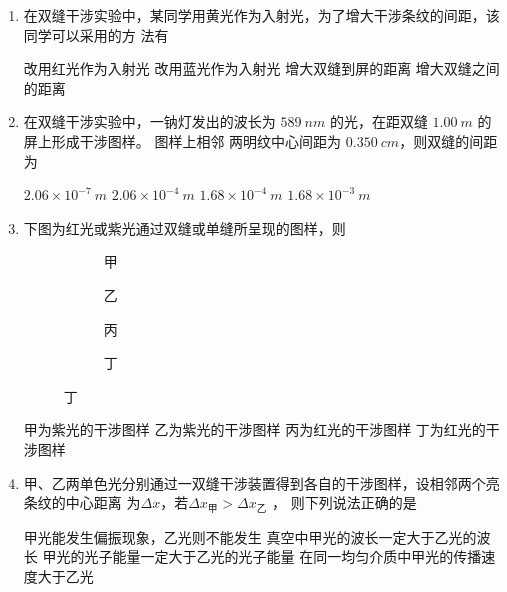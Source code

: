\begin{enumerate}
\item
{}
在双缝干涉实验中，某同学用黄光作为入射光，为了增大干涉条纹的间距，该同学可以采用的方
法有  

\fourchoices
{改用红光作为入射光}
{改用蓝光作为入射光}
{增大双缝到屏的距离}
{增大双缝之间的距离}


\item 
{}
在双缝干涉实验中，一钠灯发出的波长为 $ 589 \ nm $ 的光，在距双缝 $ 1.00 \ m $ 的屏上形成干涉图样。
图样上相邻 两明纹中心间距为 $ 0.350 \ cm $，则双缝的间距为  

\fourchoices
{$ 2.06 \times 10^{-7} \ m $}
{$ 2.06 \times 10^{-4} \ m $}
{$ 1.68 \times 10^{-4} \ m $}
{$ 1.68 \times 10^{-3} \ m $}


\item 
{}
下图为红光或紫光通过双缝或单缝所呈现的图样，则  
\begin{figure}[h!]
	\centering
\begin{subfigure}{0.22\linewidth}
	\centering
	 
	\caption*{甲}\label{}
\end{subfigure}
\begin{subfigure}{0.22\linewidth}
	\centering
	 
	\caption*{乙}\label{}
\end{subfigure}
\begin{subfigure}{0.22\linewidth}
	\centering
	 
	\caption*{丙}\label{}
\end{subfigure}
\begin{subfigure}{0.22\linewidth}
	\centering
	 
	\caption*{丁}\label{}
\end{subfigure}
\end{figure}

\fourchoices
{甲为紫光的干涉图样}
{乙为紫光的干涉图样}
{丙为红光的干涉图样}
{丁为红光的干涉图样}



\item 
{}
甲、乙两单色光分别通过一双缝干涉装置得到各自的干涉图样，设相邻两个亮条纹的中心距离
为$ \Delta x $，若$ \Delta x _{ \text{甲} } > \Delta x_{ \text{乙} } $ ， 则下列说法正确的是  

\fourchoices
{甲光能发生偏振现象，乙光则不能发生}
{真空中甲光的波长一定大于乙光的波长}
{甲光的光子能量一定大于乙光的光子能量}
{在同一均匀介质中甲光的传播速度大于乙光}




\end{enumerate}
